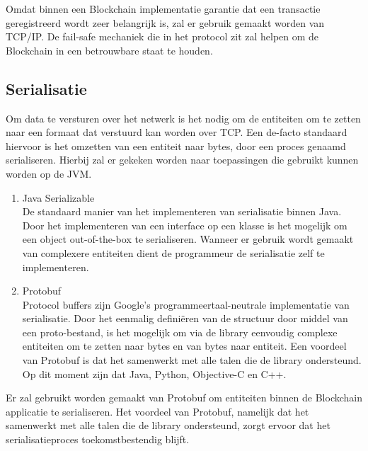 Omdat binnen een Blockchain implementatie garantie dat een transactie geregistreerd wordt zeer belangrijk is, zal er gebruik gemaakt worden van TCP/IP. De fail-safe mechaniek die in het protocol zit zal helpen om de Blockchain in een betrouwbare staat te houden.

\newpage
\subsection{Serialisatie}

Om data te versturen over het netwerk is het nodig om de entiteiten om te zetten naar een formaat dat verstuurd kan worden over \acrshort{TCP}. Een de-facto standaard hiervoor is het omzetten van een entiteit naar bytes, door een proces genaamd serialiseren. Hierbij zal er gekeken worden naar toepassingen die gebruikt kunnen worden op de \acrfull{JVM}.

\begin{enumerate}
  \item Java Serializable
  \\ De standaard manier van het implementeren van serialisatie binnen Java. Door het implementeren van een interface op een klasse is het mogelijk om een object out-of-the-box te serialiseren. Wanneer er gebruik wordt gemaakt van complexere entiteiten dient de programmeur de serialisatie zelf te implementeren.
  \item Protobuf
  \\ Protocol buffers zijn Google's programmeertaal-neutrale implementatie van serialisatie. Door het eenmalig definiëren van de structuur door middel van een proto-bestand, is het mogelijk om via de library eenvoudig complexe entiteiten om te zetten naar bytes en van bytes naar entiteit. Een voordeel van Protobuf is dat het samenwerkt met alle talen die de library ondersteund. Op dit moment zijn dat Java, Python, Objective-C en C++.
\end{enumerate}

Er zal gebruikt worden gemaakt van Protobuf om entiteiten binnen de Blockchain applicatie te serialiseren. Het voordeel van Protobuf, namelijk dat het samenwerkt met alle talen die de library ondersteund, zorgt ervoor dat het serialisatieproces toekomstbestendig blijft.